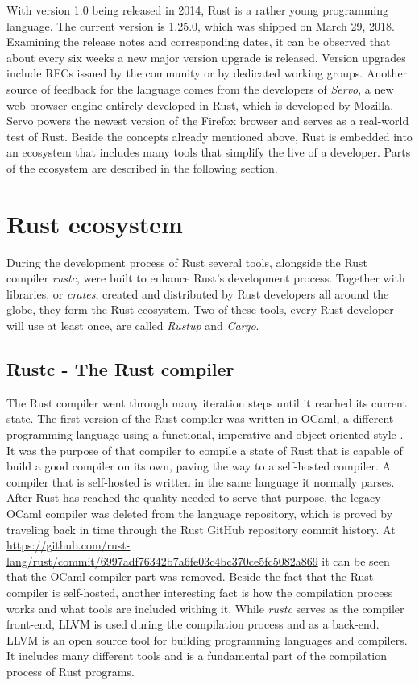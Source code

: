 With version 1.0 being released in 2014, Rust is a rather young programming language. The current version is 1.25.0, which was shipped on March 29, 2018. Examining the release notes and corresponding dates, it can be observed that about every six weeks a new major version upgrade is released. Version upgrades include \acp{RFC} issued by the community or by dedicated working groups. Another source of feedback for the language comes from the developers of \textit{Servo}, a new web browser engine entirely developed in Rust, which is developed by Mozilla. Servo powers the newest version of the Firefox browser and serves as a real-world test of Rust. Beside the concepts already mentioned above, Rust is embedded into an ecosystem that includes many tools that simplify the live of a developer. Parts of the ecosystem are described in the following section.

\section{Rust ecosystem}

During the development process of Rust several tools, alongside the Rust compiler \textit{rustc}, were built to enhance Rust's development process. Together with libraries, or \textit{crates}, created and distributed by Rust developers all around the globe, they form the Rust ecosystem. Two of these tools, every Rust developer will use at least once, are called \textit{Rustup} and \textit{Cargo}. 

\subsection{Rustc - The Rust compiler}

The Rust compiler went through many iteration steps until it reached its current state. The first version of the Rust compiler was written in OCaml, a different programming language using a functional, imperative and object-oriented style \cite{OCAML}. It was the purpose of that compiler to compile a state of Rust that is capable of build a good compiler on its own, paving the way to a self-hosted compiler. A compiler that is self-hosted is written in the same language it normally parses. After Rust has reached the quality needed to serve that purpose, the legacy OCaml compiler was deleted from the language repository, which is proved by traveling back in time through the Rust GitHub repository commit history. At \url{https://github.com/rust-lang/rust/commit/6997adf76342b7a6fe03c4bc370ce5fc5082a869} it can be seen that the OCaml compiler part was removed. Beside the fact that the Rust compiler is self-hosted, another interesting fact is how the compilation process works and what tools are included withing it. While \textit{rustc} serves as the compiler front-end, \ac{LLVM} is used during the compilation process and as a back-end. \ac{LLVM} is an open source tool for building programming languages and compilers. It includes many different tools and is a fundamental part of the compilation process of Rust programs.

